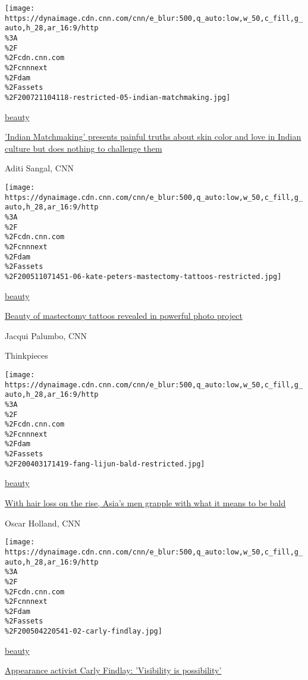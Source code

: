 \texttt{[image: https://dynaimage.cdn.cnn.com/cnn/e\_blur:500,q\_auto:low,w\_50,c\_fill,g\_auto,h\_28,ar\_16:9/http\\\%3A\\\%2F\\\%2Fcdn.cnn.com\\\%2Fcnnnext\\\%2Fdam\\\%2Fassets\\\%2F200721104118-restricted-05-indian-matchmaking.jpg]}

\href{/style/beauty}{beauty}

\href{/style/article/indian-matchmaking-netflix-intl-hnk-beauty/index.html}{'Indian
Matchmaking' presents painful truths about skin color and love in Indian
culture but does nothing to challenge them}

Aditi Sangal, CNN

\href{/style/article/kate-peters-mastectomy-tattoos/index.html}{}

\texttt{[image: https://dynaimage.cdn.cnn.com/cnn/e\_blur:500,q\_auto:low,w\_50,c\_fill,g\_auto,h\_28,ar\_16:9/http\\\%3A\\\%2F\\\%2Fcdn.cnn.com\\\%2Fcnnnext\\\%2Fdam\\\%2Fassets\\\%2F200511071451-06-kate-peters-mastectomy-tattoos-restricted.jpg]}

\href{/style/beauty}{beauty}

\href{/style/article/kate-peters-mastectomy-tattoos/index.html}{Beauty
of mastectomy tattoos revealed in powerful photo project}

Jacqui Palumbo, CNN

Thinkpieces

\href{/style/article/asia-men-hair-loss-bald-scn-wellness/index.html}{}

\texttt{[image: https://dynaimage.cdn.cnn.com/cnn/e\_blur:500,q\_auto:low,w\_50,c\_fill,g\_auto,h\_28,ar\_16:9/http\\\%3A\\\%2F\\\%2Fcdn.cnn.com\\\%2Fcnnnext\\\%2Fdam\\\%2Fassets\\\%2F200403171419-fang-lijun-bald-restricted.jpg]}

\href{/style/beauty}{beauty}

\href{/style/article/asia-men-hair-loss-bald-scn-wellness/index.html}{With
hair loss on the rise, Asia's men grapple with what it means to be bald}

Oscar Holland, CNN

\href{/style/article/carly-findlay-australia-beauty/index.html}{}

\texttt{[image: https://dynaimage.cdn.cnn.com/cnn/e\_blur:500,q\_auto:low,w\_50,c\_fill,g\_auto,h\_28,ar\_16:9/http\\\%3A\\\%2F\\\%2Fcdn.cnn.com\\\%2Fcnnnext\\\%2Fdam\\\%2Fassets\\\%2F200504220541-02-carly-findlay.jpg]}

\href{/style/beauty}{beauty}

\href{/style/article/carly-findlay-australia-beauty/index.html}{Appearance
activist Carly Findlay: 'Visibility is possibility'}

